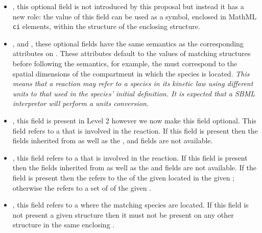 \documentclass{cekarticle}
\begin{document}
\begin{itemize}

\item {}, this optional  field is not
introduced by this proposal but instead it has a new role: the
value of this field can be used as a symbol, enclosed in MathML
\texttt{ci} elements, within the  structure of
the enclosing  structure.

\item {},  and
, these optional fields have the
same semantics as the corresponding attributes on .
These attributes default to the values of matching 
structures before following the  semantics, for
example, the  must correspond to the
spatial dimensions of the compartment in which the species is
located.  \emph{This means that a reaction may refer to a species
in its kinetic law using different units to that used in the
species' initial definition.  It is expected that a SBML
interpretor will perform a units conversion.}

\item {}, this  field is present in Level 2 however we now make this field
optional.  This field refers to a  that is involved in the reaction.  If this field is
present then the fields inherited from  as well as the ,
 and  fields are not available.

\item {}, this  field refers to a  that is
involved in the reaction.  If this field is
present then the fields inherited from  as well as the
 and  fields are not available.  If the 
field is present then the  refers to the  of
the given  located in the given ; otherwise the
 refers to a set of  of the given .

\item {}, this  field refers to a
 where the matching species are located. If
this field is not present a given 
structure then it must not be present on any other
 structure in the same enclosing
.

\end{itemize}
\end{document}
